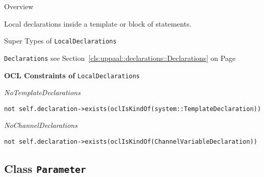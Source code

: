 	\begin{longdescription}
		\item[Overview] 		
				

	

		Local declarations inside a template or block of statements.		
		\item[Super Types of \texttt{LocalDeclarations}] ~
			\begin{longdescription}
				\item[\texttt{Declarations}] see Section~\ref{cls:uppaal::declarations::Declarations} on Page~\pageref{cls:uppaal::declarations::Declarations}						\end{longdescription}
		
	
			\item[\textbf{OCL Constraints of} \texttt{LocalDeclarations}] ~
			\begin{longdescription}
	\item[\small\textit{NoTemplateDeclarations}] ~ 
	\nopagebreak
	
		\begin{lstlisting}[breaklines=true]
not self.declaration->exists(oclIsKindOf(system::TemplateDeclaration))		\end{lstlisting}
	\item[\small\textit{NoChannelDeclarations}] ~ 
	\nopagebreak
	
		\begin{lstlisting}[breaklines=true]
not self.declaration->exists(oclIsKindOf(ChannelVariableDeclaration))		\end{lstlisting}
			\end{longdescription}
	
	\end{longdescription}
	

\subsection{Class \bfseries \texttt{Parameter}\normalfont}
\label{cls:uppaal::declarations::Parameter} 
	

